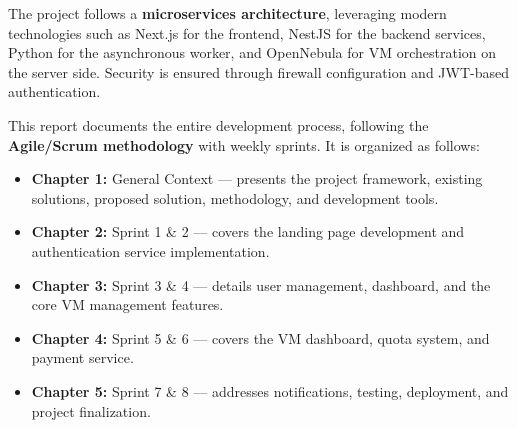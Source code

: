 \documentclass[a4paper, 12pt, oneside]{report}
\begin{document}
The project follows a \textbf{microservices architecture}, leveraging modern technologies such as Next.js for the frontend, NestJS for the backend services, Python for the asynchronous worker, and OpenNebula for VM orchestration on the server side. Security is ensured through firewall configuration and JWT-based authentication.

This report documents the entire development process, following the \textbf{Agile/Scrum methodology} with weekly sprints. It is organized as follows:

\begin{itemize}
  \item \textbf{Chapter 1:} General Context — presents the project framework, existing solutions, proposed solution, methodology, and development tools.
  \item \textbf{Chapter 2:} Sprint 1 \& 2 — covers the landing page development and authentication service implementation.
  \item \textbf{Chapter 3:} Sprint 3 \& 4 — details user management, dashboard, and the core VM management features.
  \item \textbf{Chapter 4:} Sprint 5 \& 6 — covers the VM dashboard, quota system, and payment service.
  \item \textbf{Chapter 5:} Sprint 7 \& 8 — addresses notifications, testing, deployment, and project finalization.
\end{itemize}

\newpage



% 

% 

% 

% 
\end{document}
